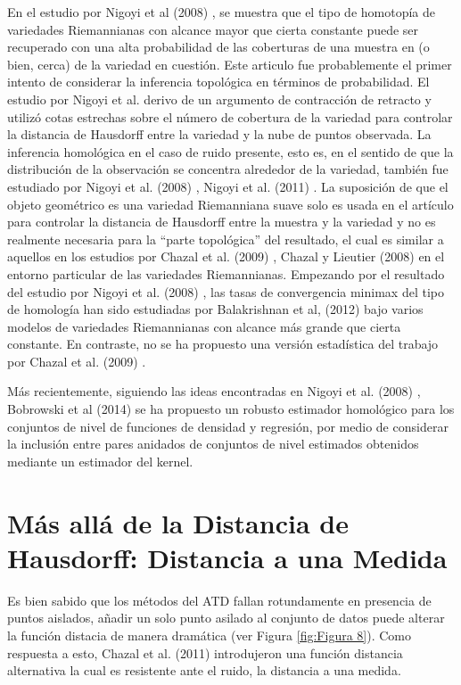 En el estudio por Nigoyi et al (2008) \cite{Niyogi2008}, se muestra que el tipo de homotop\'ia de
variedades Riemannianas con alcance mayor que cierta constante puede ser recuperado con una
alta probabilidad de las coberturas de una muestra en (o bien, cerca) de la variedad en cuesti\'on.
Este articulo fue probablemente el primer intento de considerar la inferencia topol\'ogica en t\'erminos
de probabilidad. El estudio por Nigoyi et al.\cite{Niyogi2008} derivo de un argumento de contracci\'on de
retracto y utiliz\'o cotas estrechas sobre el n\'umero de cobertura de la variedad para controlar
la distancia de Hausdorff entre la variedad y la nube de puntos observada. La inferencia homol\'ogica
en el caso de ruido presente, esto es, en el sentido de que la distribuci\'on de la observaci\'on se
concentra alrededor de la variedad, tambi\'en fue estudiado por Nigoyi et al. (2008) \cite{Niyogi2008},
Nigoyi et al. (2011) \cite{Niyogi2008}. La suposici\'on de que el objeto geom\'etrico es una variedad
Riemanniana suave solo es usada en el art\'iculo para controlar la distancia de Hausdorff entre la
muestra y la variedad y no es realmente necesaria para la ``parte topol\'ogica'' del resultado, el cual
es similar a aquellos en los estudios por Chazal et al. (2009) \cite{Chazal2009d}, Chazal y Lieutier
(2008) \cite{Chazal2008} en el entorno particular de las variedades Riemannianas. Empezando por el
resultado del estudio por Nigoyi et al. (2008) \cite{Niyogi2008}, las tasas de convergencia minimax
del tipo de homolog\'ia han sido estudiadas por Balakrishnan et al, (2012) \cite{Balakrishnan2012}
bajo varios modelos de variedades Riemannianas con alcance m\'as grande que cierta constante. En contraste, no se ha propuesto una versi\'on estad\'istica del trabajo por Chazal et al. (2009)
\cite{Chazal2009d}.

M\'as recientemente, siguiendo las ideas encontradas en Nigoyi et al. (2008) \cite{Niyogi2008},
Bobrowski et al (2014) \cite{Bobrowski2014} se ha propuesto un robusto estimador homol\'ogico para los
conjuntos de nivel de funciones de densidad y regresi\'on, por medio de considerar la inclusi\'on entre
pares anidados de conjuntos de nivel estimados obtenidos mediante un estimador del kernel.

\section{M\'as all\'a de la Distancia de Hausdorff: Distancia a una Medida}\label{sec: 3.3}

Es bien sabido que los m\'etodos del ATD fallan rotundamente en presencia de puntos aislados, a\~{n}adir
un solo punto asilado al conjunto de datos puede alterar la funci\'on distacia de manera dram\'atica
(ver Figura \ref{fig:Figura 8}). Como respuesta a esto, Chazal et al. (2011) \cite{Chazal2011b}
introdujeron una funci\'on distancia alternativa la cual es resistente ante el ruido, la distancia a una
medida.

